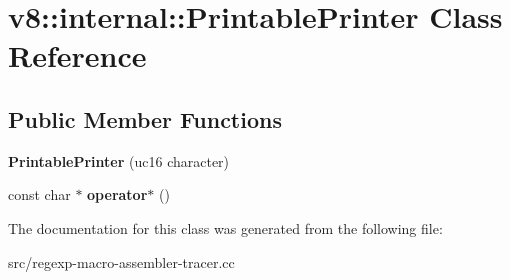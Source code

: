 \hypertarget{classv8_1_1internal_1_1_printable_printer}{}\section{v8\+:\+:internal\+:\+:Printable\+Printer Class Reference}
\label{classv8_1_1internal_1_1_printable_printer}
\subsection*{Public Member Functions}
\begin{DoxyCompactItemize}
\item 
\hypertarget{classv8_1_1internal_1_1_printable_printer_a7b46fedda0d89f439869b2e2f7358ded}{}{\bfseries Printable\+Printer} (uc16 character)\label{classv8_1_1internal_1_1_printable_printer_a7b46fedda0d89f439869b2e2f7358ded}

\item 
\hypertarget{classv8_1_1internal_1_1_printable_printer_a07570a64d144f3b2ec80c07ee23ed3c5}{}const char $\ast$ {\bfseries operator$\ast$} ()\label{classv8_1_1internal_1_1_printable_printer_a07570a64d144f3b2ec80c07ee23ed3c5}

\end{DoxyCompactItemize}


The documentation for this class was generated from the following file\+:\begin{DoxyCompactItemize}
\item 
src/regexp-\/macro-\/assembler-\/tracer.\+cc\end{DoxyCompactItemize}
